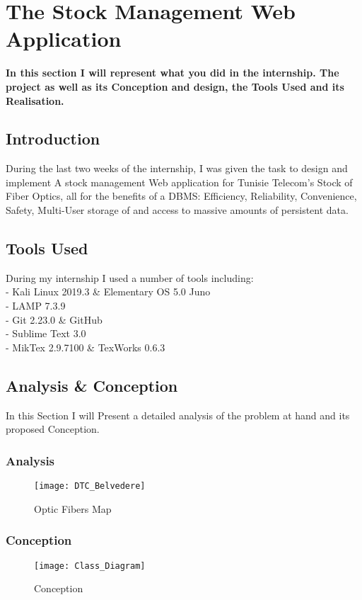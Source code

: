 \chapter{The Stock Management Web Application} %
\label{chap:app}
\textbf{In this section I will represent what you did in the internship. The project as well as its Conception and design, the Tools Used and its Realisation.}

\section{Introduction}%
	During the last two weeks of the internship, I was given the task to design and implement A stock management Web application for Tunisie Telecom's Stock of Fiber Optics, all for the benefits of a DBMS:  Efficiency, Reliability, Convenience, Safety, Multi-User storage of and access to massive amounts of persistent data.
\section{Tools Used}
	During my internship I used a number of tools including: \\
		- Kali Linux 2019.3 \& Elementary OS 5.0 Juno\\
		- LAMP 7.3.9 \\
		- Git 2.23.0 \& GitHub\\
		- Sublime Text 3.0 \\
		- MikTex 2.9.7100 \& TexWorks 0.6.3 \\
\section{Analysis \& Conception} %
	In this Section I will Present a detailed analysis of the problem at hand and its proposed Conception.
\subsection{Analysis}
	
	\begin{figure}[ht!] %
  \centering
  \texttt{[image: DTC\_Belvedere]}
  \caption[DTC Belvedere]{Optic Fibers Map}%
  \label{fig:OFMap}
\end{figure}


\subsection{Conception}
\begin{figure}[ht!] %
  \centering
  \texttt{[image: Class\_Diagram]}
  \caption[Class Diagram]{Conception}%
  \label{fig:DiagClass1}
\end{figure}

